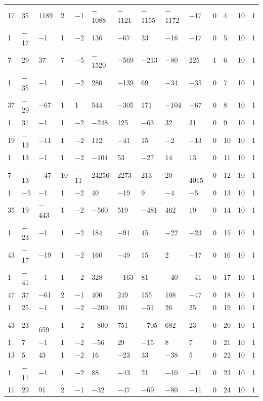 \documentclass[10pt,a4paper]{amsart}
\numberwithin{equation}{section}
\theoremstyle{definition}
\numberwithin{table}{section}
\begin{document}
{\begin{paracol}{3}
\begin{supertabular}{|w{c}{.32cm}w{c}{.32cm}w{c}{.32cm}@{\hspace{.5cm}}w{c}{.2cm}w{c}{.2cm}|@{\hspace{\tabcolsep}}HHHHHHw{c}{.17cm}w{c}{.17cm}w{c}{.17cm}|}
			17 & 35 & 1189 & 2 & $-$1 & $-$1088 & $-$1121 & $-$1155 & $-$1172 & $-$17 & 0 & 4 & 10 & 1 \\
			1 & $-$17 & $-$1 & 1 & $-$2 & 136 & $-$67 & 33 & $-$16 & $-$17 & 0 & 5 & 10 & 1 \\
			7 & 29 & 37 & 7 & $-$5 & $-$1520 & $-$569 & $-$213 & $-$80 & 225 & 1 & 6 & 10 & 1 \\
			1 & $-$35 & $-$1 & 1 & $-$2 & 280 & $-$139 & 69 & $-$34 & $-$35 & 0 & 7 & 10 & 1 \\
			37 & $-$29 & $-$67 & 1 & 1 & 544 & $-$305 & 171 & $-$104 & $-$67 & 0 & 8 & 10 & 1 \\
			1 & 31 & $-$1 & 1 & $-$2 & $-$248 & 125 & $-$63 & 32 & 31 & 0 & 9 & 10 & 1 \\
			19 & $-$13 & $-$11 & 1 & $-$2 & 112 & $-$41 & 15 & $-$2 & $-$13 & 0 & 10 & 10 & 1 \\
			1 & 13 & $-$1 & 1 & $-$2 & $-$104 & 53 & $-$27 & 14 & 13 & 0 & 11 & 10 & 1 \\
			7 & $-$13 & $-$47 & 10 & $-$11 & 24256 & 2273 & 213 & 20 & $-$4015 & 0 & 12 & 10 & 1 \\
			1 & $-$5 & $-$1 & 1 & $-$2 & 40 & $-$19 & 9 & $-$4 & $-$5 & 0 & 13 & 10 & 1 \\
			35 & 19 & $-$443 & 1 & $-$2 & $-$560 & 519 & $-$481 & 462 & 19 & 0 & 14 & 10 & 1 \\
			1 & $-$23 & $-$1 & 1 & $-$2 & 184 & $-$91 & 45 & $-$22 & $-$23 & 0 & 15 & 10 & 1 \\
			43 & $-$17 & $-$19 & 1 & $-$2 & 160 & $-$49 & 15 & 2 & $-$17 & 0 & 16 & 10 & 1 \\
			1 & $-$41 & $-$1 & 1 & $-$2 & 328 & $-$163 & 81 & $-$40 & $-$41 & 0 & 17 & 10 & 1 \\
			47 & 37 & $-$61 & 2 & $-$1 & 400 & 249 & 155 & 108 & $-$47 & 0 & 18 & 10 & 1 \\
			1 & 25 & $-$1 & 1 & $-$2 & $-$200 & 101 & $-$51 & 26 & 25 & 0 & 19 & 10 & 1 \\
			43 & 23 & $-$659 & 1 & $-$2 & $-$800 & 751 & $-$705 & 682 & 23 & 0 & 20 & 10 & 1 \\
			1 & 7 & $-$1 & 1 & $-$2 & $-$56 & 29 & $-$15 & 8 & 7 & 0 & 21 & 10 & 1 \\
			13 & 5 & 43 & 1 & $-$2 & 16 & $-$23 & 33 & $-$38 & 5 & 0 & 22 & 10 & 1 \\
			1 & $-$11 & $-$1 & 1 & $-$2 & 88 & $-$43 & 21 & $-$10 & $-$11 & 0 & 23 & 10 & 1 \\
			11 & 29 & 91 & 2 & $-$1 & $-$32 & $-$47 & $-$69 & $-$80 & $-$11 & 0 & 24 & 10 & 1 \\

\end{supertabular}
\end{paracol}}
\end{document}
